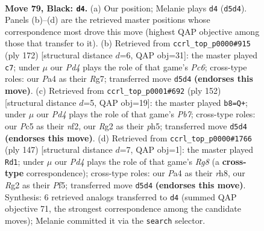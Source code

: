 \documentclass[11pt]{article}
\begin{document}
\clearpage

\begin{figure}[p]\centering
\begin{subfigure}{0.46\textwidth}\centering
\resizebox{\linewidth}{!}{%
\newchessgame
\chessboard[
  setfen={8/4k3/8/2ppK3/p7/8/6r1/8 b - - 15 79},
  showmover=false,
  pgfstyle=straightmove, color=movearrow, markmove={d5-d4}
]}
\caption{}
\end{subfigure}\hfill
\begin{subfigure}{0.46\textwidth}\centering
\resizebox{\linewidth}{!}{%
\newchessgame
\chessboard[
  setfen={8/6R1/1PP5/1k6/8/3K1P2/8/8 w - - 1 87},
  showmover=false,
  pgfstyle=straightmove, color=movearrow, markmove={c6-c7}
]}
\caption{}
\end{subfigure}
\\[4pt]
\begin{subfigure}{0.46\textwidth}\centering
\resizebox{\linewidth}{!}{%
\newchessgame
\chessboard[
  setfen={8/1Pk5/8/3K3p/7P/8/5n2/8 w - - 3 77},
  showmover=false,
  pgfstyle=straightmove, color=movearrow, markmove={b7-b8}
]}
\caption{}
\end{subfigure}\hfill
\begin{subfigure}{0.46\textwidth}\centering
\resizebox{\linewidth}{!}{%
\newchessgame
\chessboard[
  setfen={7R/8/8/5p2/7p/5k2/7K/6r1 b - - 7 74},
  showmover=false,
  pgfstyle=straightmove, color=movearrow, markmove={g1-d1}
]}
\caption{}
\end{subfigure}
\caption{\textbf{Move 79, Black: \texttt{d4}.} (a) Our position; Melanie plays \texttt{d4} (\texttt{d5d4}). Panels (b)--(d) are the retrieved master positions whose correspondence most drove this move (highest QAP objective among those that transfer to it). (b) Retrieved from \texttt{ccrl\_top\_p0000\#915} (ply 172) [structural distance $d$=6, QAP obj=31]: the master played \texttt{c7}; under $\mu$ our \emph{Pd4} plays the role of that game's \emph{Pc6}; cross-type roles: our \emph{P}a4 as their \emph{R}g7; transferred move \texttt{d5d4} \textbf{(endorses this move)}. (c) Retrieved from \texttt{ccrl\_top\_p0001\#692} (ply 152) [structural distance $d$=5, QAP obj=19]: the master played \texttt{b8=Q+}; under $\mu$ our \emph{Pd4} plays the role of that game's \emph{Pb7}; cross-type roles: our \emph{P}c5 as their \emph{n}f2, our \emph{R}g2 as their \emph{p}h5; transferred move \texttt{d5d4} \textbf{(endorses this move)}. (d) Retrieved from \texttt{ccrl\_top\_p0000\#1766} (ply 147) [structural distance $d$=7, QAP obj=1]: the master played \texttt{Rd1}; under $\mu$ our \emph{Pd4} plays the role of that game's \emph{Rg8} (a \textbf{cross-type} correspondence); cross-type roles: our \emph{P}a4 as their \emph{r}h8, our \emph{R}g2 as their \emph{P}f5; transferred move \texttt{d5d4} \textbf{(endorses this move)}. Synthesis: 6 retrieved analogs transferred to \texttt{d4} (summed QAP objective 71, the strongest correspondence among the candidate moves); Melanie committed it via the \texttt{search} selector.}
\label{fig:thought-m157}
\end{figure}
\end{document}
